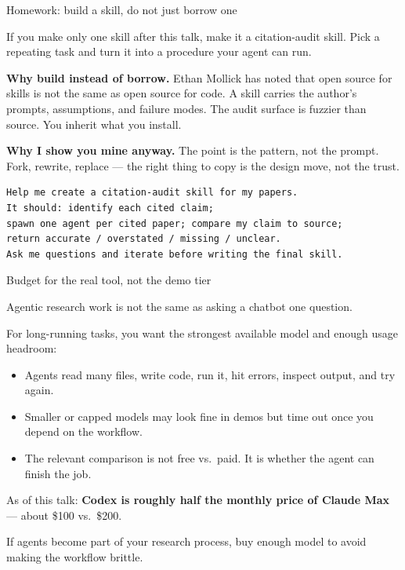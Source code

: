 \documentclass[aspectratio=169,11pt]{beamer}
\begin{document}
\begin{frame}[fragile,shrink=6]{Homework: build a skill, do not just borrow one}

If you make only one skill after this talk, make it a citation-audit skill. Pick a repeating task and turn it into a procedure your agent can run.

\vspace{0.25cm}

\textbf{Why build instead of borrow.} Ethan Mollick has noted that open source for skills is not the same as open source for code. A skill carries the author's prompts, assumptions, and failure modes. The audit surface is fuzzier than source. You inherit what you install.

\vspace{0.2cm}

\textbf{Why I show you mine anyway.} The point is the pattern, not the prompt. Fork, rewrite, replace --- the right thing to copy is the design move, not the trust.

\vspace{0.2cm}

\begin{verbatim}
Help me create a citation-audit skill for my papers.
It should: identify each cited claim;
spawn one agent per cited paper; compare my claim to source;
return accurate / overstated / missing / unclear.
Ask me questions and iterate before writing the final skill.
\end{verbatim}

\end{frame}

\begin{frame}[shrink=6]{Budget for the real tool, not the demo tier}

Agentic research work is not the same as asking a chatbot one question.

\vspace{0.35cm}

For long-running tasks, you want the strongest available model and enough usage headroom:

\begin{itemize}\setlength\itemsep{0.35em}
    \item Agents read many files, write code, run it, hit errors, inspect output, and try again.
    \item Smaller or capped models may look fine in demos but time out once you depend on the workflow.
    \item The relevant comparison is not free vs.\ paid. It is whether the agent can finish the job.
\end{itemize}

\vspace{0.35cm}

As of this talk: \textbf{Codex is roughly half the monthly price of Claude Max} --- about \$100 vs.\ \$200.

\vspace{0.25cm}

\alert{If agents become part of your research process, buy enough model to avoid making the workflow brittle.}

\end{frame}
\end{document}
